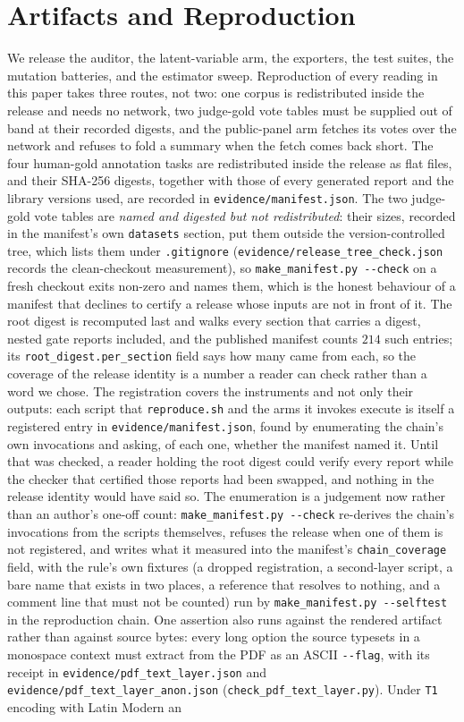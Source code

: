 \documentclass{article}
\newcommand{\ids}[1]{\texttt{\small #1}} %
\begin{document}
\section{Artifacts and Reproduction}
\label{sec:artifacts} We release the auditor, the latent-variable arm, the exporters, the test suites, the mutation batteries, and the estimator sweep. Reproduction of every reading in this paper takes three routes, not two: one corpus is redistributed inside the release and needs no network, two judge-gold vote tables must be supplied out of band at their recorded digests, and the public-panel arm fetches its votes over the network and refuses to fold a summary when the fetch comes back short. The four human-gold annotation tasks are redistributed inside the release as flat files, and their SHA-256 digests, together with those of every generated report and the library versions used, are recorded in \ids{evidence/manifest.json}. The two judge-gold vote tables are \emph{named and digested but not redistributed}: their sizes, recorded in the manifest's own \texttt{datasets} section, put them outside the version-controlled tree, which lists them under \ids{.gitignore} (\ids{evidence/release\_tree\_check.json} records the clean-checkout measurement), so \ids{make\_manifest.py -{}-check} on a fresh checkout exits non-zero and names them, which is the honest behaviour of a manifest that declines to certify a release whose inputs are not in front of it. The root digest is recomputed last and walks every section that carries a digest, nested gate reports included, and the published manifest counts $214$ such entries; its \texttt{root\_digest.per\_section} field says how many came from each, so the coverage of the release identity is a number a reader can check rather than a word we chose. The registration covers the instruments and not only their outputs: each script that \ids{reproduce.sh} and the arms it invokes execute is itself a registered entry in \ids{evidence/manifest.json}, found by enumerating the chain's own invocations and asking, of each one, whether the manifest named it. Until that was checked, a reader holding the root digest could verify every report while the checker that certified those reports had been swapped, and nothing in the release identity would have said so. The enumeration is a judgement now rather than an author's one-off count: \ids{make\_manifest.py -{}-check} re-derives the chain's invocations from the scripts themselves, refuses the release when one of them is not registered, and writes what it measured into the manifest's \texttt{chain\_coverage} field, with the rule's own fixtures (a dropped registration, a second-layer script, a bare name that exists in two places, a reference that resolves to nothing, and a comment line that must not be counted) run by \ids{make\_manifest.py -{}-selftest} in the reproduction chain. One assertion also runs against the rendered artifact rather than against source bytes: every long option the source typesets in a monospace context must extract from the PDF as an ASCII \texttt{-{}-flag}, with its receipt in \ids{evidence/pdf\_text\_layer.json} and \ids{evidence/pdf\_text\_layer\_anon.json} (\ids{check\_pdf\_text\_layer.py}). Under \texttt{T1} encoding with Latin Modern an 
\end{document}
